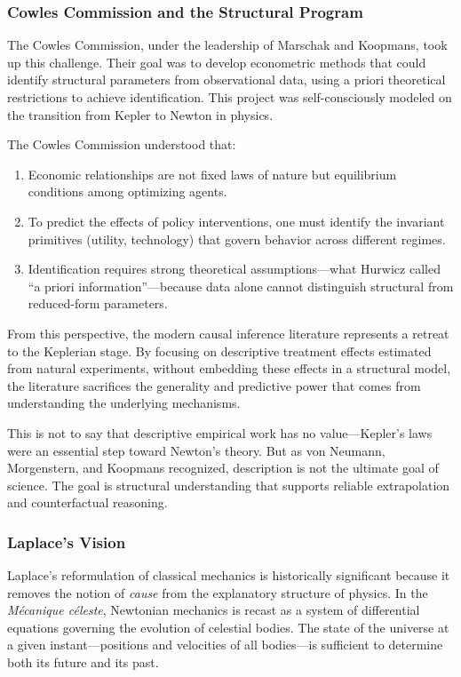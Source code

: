 \documentclass[12pt]{article}
\begin{document}
\subsubsection{Cowles Commission and the Structural Program}

The Cowles Commission, under the leadership of Marschak and Koopmans, took up this challenge. Their goal was to develop econometric methods that could identify structural parameters from observational data, using a priori theoretical restrictions to achieve identification. This project was self-consciously modeled on the transition from Kepler to Newton in physics.

The Cowles Commission understood that:
\begin{enumerate}
\item Economic relationships are not fixed laws of nature but equilibrium conditions among optimizing agents.
\item To predict the effects of policy interventions, one must identify the invariant primitives (utility, technology) that govern behavior across different regimes.
\item Identification requires strong theoretical assumptions---what Hurwicz called ``a priori information''---because data alone cannot distinguish structural from reduced-form parameters.
\end{enumerate}

From this perspective, the modern causal inference literature represents a retreat to the Keplerian stage. By focusing on descriptive treatment effects estimated from natural experiments, without embedding these effects in a structural model, the literature sacrifices the generality and predictive power that comes from understanding the underlying mechanisms.

This is not to say that descriptive empirical work has no value---Kepler's laws were an essential step toward Newton's theory. But as von Neumann, Morgenstern, and Koopmans recognized, description is not the ultimate goal of science. The goal is structural understanding that supports reliable extrapolation and counterfactual reasoning.


\subsubsection*{Laplace's Vision}

Laplace's reformulation of classical mechanics is historically significant because it removes the notion of \emph{cause} from the explanatory structure of physics. In the \emph{M\'ecanique c\'eleste}, Newtonian mechanics is recast as a system of differential equations governing the evolution of celestial bodies. The state of the universe at a given instant---positions and velocities of all bodies---is sufficient to determine both its future and its past.
\end{document}
